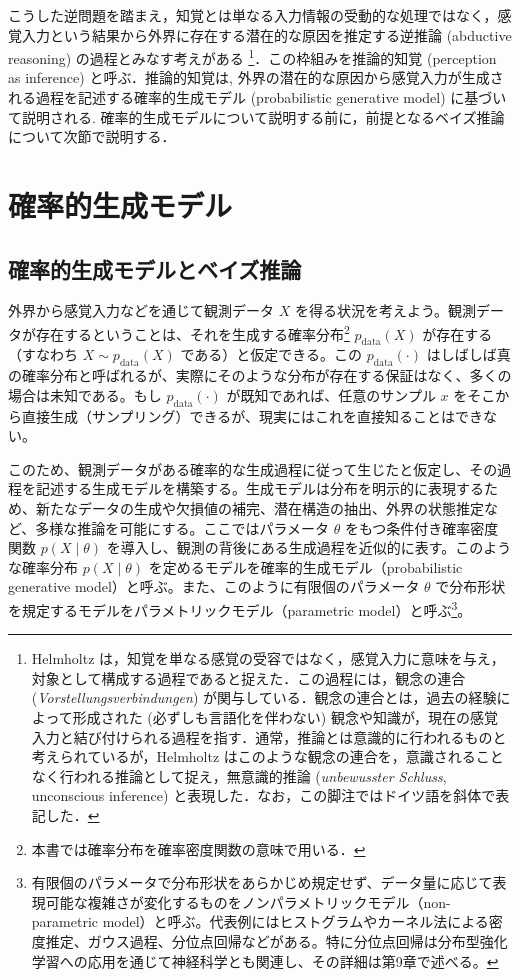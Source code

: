 \documentclass[titlepage]{ltjsbook}
\begin{document}
こうした逆問題を踏まえ，知覚とは単なる入力情報の受動的な処理ではなく，感覚入力という結果から外界に存在する潜在的な原因を推定する逆推論 (abductive reasoning) の過程とみなす考えがある \citep{helmholtz1867, mumford1992computational, kawato1993forward, friston2003learning}\footnote{Helmholtz は，知覚を単なる感覚の受容ではなく，感覚入力に意味を与え，対象として構成する過程であると捉えた．この過程には，観念の連合 (\textit{Vorstellungsverbindungen}) が関与している．観念の連合とは，過去の経験によって形成された (必ずしも言語化を伴わない) 観念や知識が，現在の感覚入力と結び付けられる過程を指す．通常，推論とは意識的に行われるものと考えられているが，Helmholtz はこのような観念の連合を，意識されることなく行われる推論として捉え，無意識的推論 (\textit{unbewusster Schluss}, unconscious inference)  と表現した．なお，この脚注ではドイツ語を斜体で表記した．}．この枠組みを推論的知覚 (perception as inference) と呼ぶ．推論的知覚は, 外界の潜在的な原因から感覚入力が生成される過程を記述する確率的生成モデル (probabilistic generative model) に基づいて説明される. 確率的生成モデルについて説明する前に，前提となるベイズ推論について次節で説明する．

\section{確率的生成モデル}
\subsection{確率的生成モデルとベイズ推論}
外界から感覚入力などを通じて観測データ $X$ を得る状況を考えよう。観測データが存在するということは、それを生成する確率分布\footnote{本書では確率分布を確率密度関数の意味で用いる．} $p_{\mathrm{data}}(X)$ が存在する（すなわち $X \sim p_{\mathrm{data}}(X)$ である）と仮定できる。この $p_{\mathrm{data}}(\cdot)$ はしばしば真の確率分布と呼ばれるが、実際にそのような分布が存在する保証はなく、多くの場合は未知である。もし $p_{\mathrm{data}}(\cdot)$ が既知であれば、任意のサンプル $x$ をそこから直接生成（サンプリング）できるが、現実にはこれを直接知ることはできない。

このため、観測データがある確率的な生成過程に従って生じたと仮定し、その過程を記述する生成モデルを構築する。生成モデルは分布を明示的に表現するため、新たなデータの生成や欠損値の補完、潜在構造の抽出、外界の状態推定など、多様な推論を可能にする。ここではパラメータ $\theta$ をもつ条件付き確率密度関数 $p(X \mid \theta)$ を導入し、観測の背後にある生成過程を近似的に表す。このような確率分布 $p(X \mid \theta)$ を定めるモデルを確率的生成モデル（probabilistic generative model）と呼ぶ。また、このように有限個のパラメータ $\theta$ で分布形状を規定するモデルをパラメトリックモデル（parametric model）と呼ぶ\footnote{有限個のパラメータで分布形状をあらかじめ規定せず、データ量に応じて表現可能な複雑さが変化するものをノンパラメトリックモデル（non-parametric model）と呼ぶ。代表例にはヒストグラムやカーネル法による密度推定、ガウス過程、分位点回帰などがある。特に分位点回帰は分布型強化学習への応用を通じて神経科学とも関連し、その詳細は第9章で述べる。}。
\end{document}
